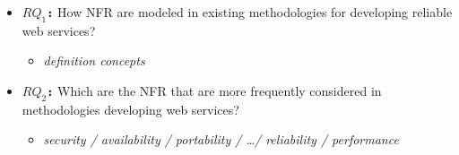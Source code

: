 \begin{itemize} 
  \item \textbf{\texttt{$RQ_1$:}} How NFR are modeled in existing methodologies
  for developing reliable web services?
  \begin{itemize}
	  \item \textit{definition concepts}
	\end{itemize}  
 \item \textbf{\texttt{$RQ_2$:}} Which are the NFR that are more frequently
 considered in methodologies developing web services?
 	\begin{itemize}
	  \item \textit{security / availability / portability / \ldots / reliability /
	  performance}
	\end{itemize}
	


\end{itemize}
